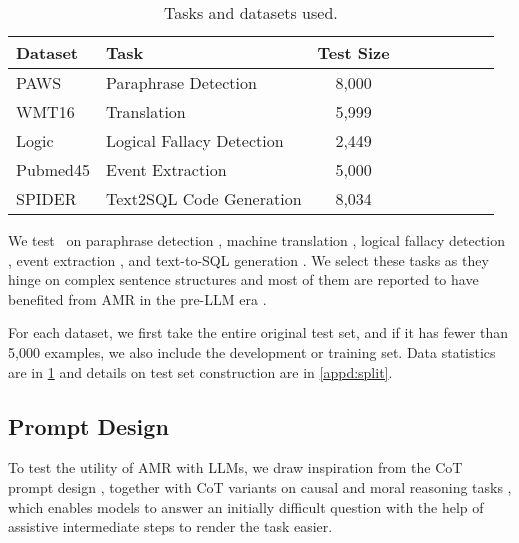 \begin{table}[ht]
    \centering
    \small
    \setlength\tabcolsep{6pt}
    \begin{tabular}{llccccccc}
    \toprule
    Dataset & Task
    & Test Size
    \\ \midrule
    PAWS & Paraphrase Detection  & 8,000 \\
    WMT16 & Translation & 5,999 \\
    Logic & Logical Fallacy Detection   & 2,449 \\
    Pubmed45 & Event Extraction&  5,000 \\
    SPIDER & Text2SQL Code Generation & 8,034 \\
    \bottomrule
    \end{tabular}
    \caption{Tasks and datasets  used.
    }
    \label{tab:data_size}
\end{table}
We test \ourmodel\ on paraphrase detection \citep{zhang2019paws}, machine translation \citep{bojar2016wmt1}, logical fallacy detection \cite{jin-etal-2022-logical}, event extraction \citep{Garg2015Extracting}, and text-to-SQL generation \citep{yu2018spider}.
We select these tasks as they hinge on complex sentence structures and
most of them are reported to have benefited from AMR in the pre-LLM era \cite{Issa2018Abstract,song2019semantic,Garg2015Extracting,yin2017syntactic}.


For each dataset,
we first take the entire original test set, and if it has fewer than  5,000 examples, we also include the development or training set.
Data statistics are in \cref{tab:data_size} and details on test set construction are in \cref{appd:split}.


\subsection{\ourmodel Prompt Design}

To test the utility of AMR with LLMs,
we draw inspiration from the CoT prompt design \cite{wei2022chain,nye2021show}, together with CoT variants on causal \cite{jin2023cladder} and moral reasoning tasks \cite{jin2022make}, which enables models to answer an initially difficult question with the help of assistive intermediate steps to 
render the task easier. 

